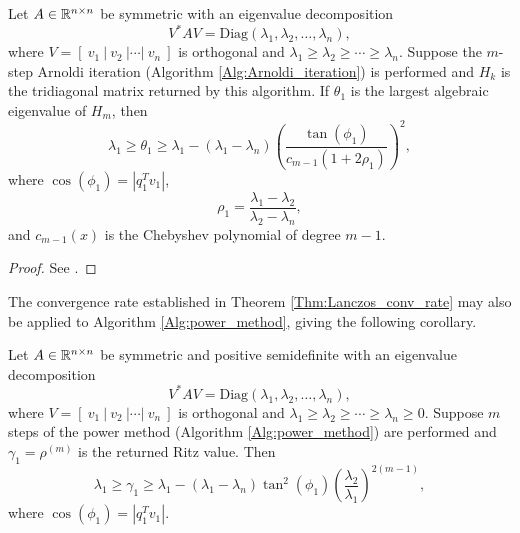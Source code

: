 \begin{enumerate}
\begin{theorem}   		\label{Thm:Lanczos_conv_rate}
Let $A \in {\mathbb R}^{n \times n}$ be symmetric with an eigenvalue decomposition
\[
V^*AV = \text{Diag}(\lambda_1, \lambda_2, \ldots, \lambda_n),
\]
where $V = [\ v_1 \ | \ v_2 \ | \cdots | \ v_n \ ]$ is orthogonal and $\lambda_1 \geq \lambda_2 \geq \cdots \geq \lambda_n$.  Suppose the $m$-step Arnoldi iteration (Algorithm \ref{Alg:Arnoldi_iteration}) is performed and $H_k$ is the tridiagonal matrix returned by this algorithm.  If $\theta_1$ is the largest algebraic eigenvalue of $H_m$, then
\begin{equation} 			\label{Eqn:Lanczos_thm_1}
\lambda_1 \geq \theta_1 \geq \lambda_1 - (\lambda_1 - \lambda_n) 
\left( \frac{\tan(\phi_1)}{c_{m-1}(1+2\rho_1)} \right)^2,
\end{equation}
where $\cos(\phi_1) = |q_1^Tv_1|$,
\begin{equation}		\label{Eqn:Lanczos_thm_2}
\rho_1 = \frac{\lambda_1 - \lambda_2}{\lambda_2 - \lambda_n},
\end{equation}
and $c_{m-1}(x)$ is the Chebyshev polynomial of degree $m-1$.
\end{theorem}

\begin{proof}
See \cite[Theorem 10.1.2]{golub2012matrix}.
\end{proof}

The convergence rate established in Theorem \ref{Thm:Lanczos_conv_rate} may also be applied to Algorithm \ref{Alg:power_method}, giving the following corollary.

\begin{corollary} 			\label{Cor:Lanczos_cor_for_power_method}
Let $A \in {\mathbb R}^{n \times n}$ be symmetric and positive semidefinite with an eigenvalue decomposition
\[
V^*AV = \text{Diag}(\lambda_1, \lambda_2, \ldots, \lambda_n),
\]
where $V = [\ v_1 \ | \ v_2 \ | \cdots | \ v_n \ ]$ is orthogonal and $\lambda_1 \geq \lambda_2 \geq \cdots \geq \lambda_n \geq 0$.  Suppose $m$ steps of the power method (Algorithm \ref{Alg:power_method}) are performed and $\gamma_1 = \rho^{(m)}$ is the returned Ritz value.  Then
\begin{equation} 			\label{Eqn:Lanczos_cor_for_power_method}
\lambda_1 \geq \gamma_1 \geq \lambda_1 - (\lambda_1 - \lambda_n) 
\tan^2(\phi_1) \left( \frac{\lambda_2}{\lambda_1} \right)^{2(m-1)},
\end{equation}
where $\cos(\phi_1) = |q_1^Tv_1|$.
\end{corollary}


\end{enumerate}
